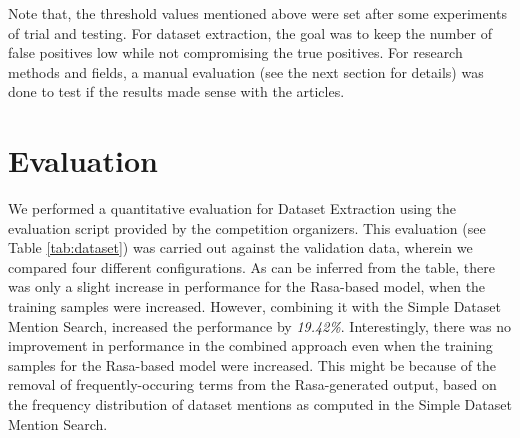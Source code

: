 \documentclass[runningheads]{llncs}
\begin{document}
Note that, the threshold values mentioned above were set after some experiments of trial and testing. For dataset extraction, the goal was to keep the number of false positives low while not compromising the true positives. %
For research methods and fields, a manual evaluation (see the next section for details) was done to test if the results made sense with the articles.

\section{Evaluation}
We performed a quantitative evaluation for Dataset Extraction using the evaluation script provided by the competition organizers. This evaluation (see Table \ref{tab:dataset}) was carried out against the validation data, wherein we compared four different configurations. As can be inferred from the table, %
there was only a slight increase in performance for the Rasa-based model, when the training samples were increased. However, combining it with the Simple Dataset Mention Search, increased the performance by \emph{19.42\%}. Interestingly, there was no improvement in performance in the combined approach even when the training samples for the Rasa-based model were increased. This might be because of the removal of frequently-occuring terms from the Rasa-generated output, based on the frequency distribution of dataset mentions as computed in the Simple Dataset Mention Search.  \\

\end{document}
